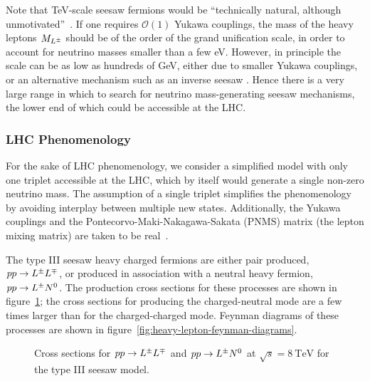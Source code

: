 Note that TeV-scale seesaw fermions would be ``technically natural, although unmotivated''~\cite{Franceschini:2008pz}. If one requires $\mathcal{O}(1)$ Yukawa couplings, the mass of the heavy leptons $M_{L^{\pm}}$ should be of the order of the grand unification scale, in order to account for neutrino masses smaller than a few eV. However, in principle the scale can be as low as hundreds of GeV, either due to smaller Yukawa couplings, or an alternative mechanism such as an inverse seesaw \cite{Biggio:2011ja}. Hence there is a very large range in which to search for neutrino mass-generating seesaw mechanisms, the lower end of which could be accessible at the LHC.

\subsubsection{LHC Phenomenology}
For the sake of LHC phenomenology, we consider a simplified model with only one triplet accessible at the LHC, which by itself would generate a single non-zero neutrino mass. The assumption of a single triplet simplifies the phenomenology by avoiding interplay between multiple new states. Additionally, the Yukawa couplings and the Pontecorvo-Maki-Nakagawa-Sakata (PNMS) matrix (the lepton mixing matrix) are taken to be real~\cite{Biggio:2011ja}. 

The type III seesaw heavy charged fermions are either pair produced, $pp\rightarrow L^{\pm}L^{\mp}$, or produced in association with a neutral heavy fermion, $pp\rightarrow L^{\pm}N^{0}$. The production cross sections for these processes are shown in figure~\ref{fig:t3ss-xsec}; the cross sections for producing the charged-neutral mode are a few times larger than for the charged-charged mode. Feynman diagrams of these processes are shown in figure~\ref{fig:heavy-lepton-feynman-diagrams}.

\begin{figure}
  \centering
  \caption{Cross sections for $pp\rightarrow L^{\pm}L^{\mp}$ and $pp\rightarrow L^{\pm}N^{0}$ at $\sqrt{s}=8~\mbox{TeV}$ for the type III seesaw model.}
  \label{fig:t3ss-xsec}
\end{figure}


